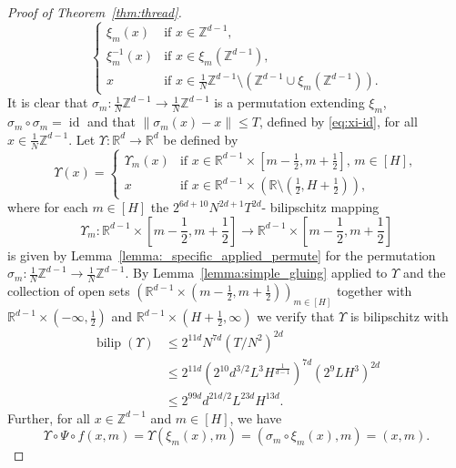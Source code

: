 \documentclass[a4paper, bibliography=totoc]{scrartcl}
\numberwithin{claimcounter}{define}
\newcommand{\R}{\mathbb{R}}
\newcommand{\Z}{\mathbb{Z}}
\newcommand{\bilip}{\operatorname{bilip}}
\DeclareMathOperator{\id}{id}
\newcommand{\enorm}[1]{\left\|#1\right\|}
\newcommand{\br}[1]{\left(#1\right)}
\newcommand{\sqbr}[1]{\left[#1\right]}
\begin{document}
\begin{proof}[Proof of Theorem~\ref{thm:thread}]
\begin{equation*}
\begin{cases}
	\xi_{m}(x) & \text{if }x\in \Z^{d-1},\\
	\xi^{-1}_{m}(x) & \text{if }x\in \xi_{m}(\Z^{d-1}),\\
	x & \text{if }x\in \frac{1}{N}\Z^{d-1}\setminus \br{\Z^{d-1}\cup \xi_{m}\br{\Z^{d-1}}}.
	\end{cases}
	\end{equation*}
	It is clear that $\sigma_{m}\colon \frac{1}{N}\Z^{d-1}\to \frac{1}{N}\Z^{d-1}$ is a permutation extending $\xi_{m}$, $\sigma_{m}\circ \sigma_{m}=\id$ and that $\enorm{\sigma_{m}(x)-x}\leq T$, defined by \eqref{eq:xi-id}, for all $x\in\frac{1}{N}\Z^{d-1}$.  
	Let $\Upsilon \colon \R^{d}\to \R^{d}$ be defined by
	\begin{equation*}
	\Upsilon(x)=\begin{cases}
	\Upsilon_{m}(x) & \text{if }x\in \R^{d-1}\times\sqbr{m-\frac{1}{2},m+\frac{1}{2}},\, m\in [H],\\
	x & \text{if }x\in\R^{d-1}\times\br{\R\setminus \br{\frac{1}{2},H+\frac{1}{2}}},
	\end{cases}
	\end{equation*}
	where for each $m\in[H]$ the  $2^{6d+10}N^{2d+1}T^{2d}$- bilipschitz mapping
	\begin{equation*}
	\Upsilon_{m}\colon \R^{d-1}\times\sqbr{m-\frac{1}{2},m+\frac{1}{2}}\to\R^{d-1}\times \sqbr{m-\frac{1}{2},m+\frac{1}{2}}
	\end{equation*}
	is given by Lemma~\ref{lemma:_specific_applied_permute} for the permutation $\sigma_{m}\colon \frac{1}{N}\Z^{d-1}\to \frac{1}{N}\Z^{d-1}$. 
	By Lemma~\ref{lemma:simple_gluing} applied to $\Upsilon$ and the collection of open sets $\br{\R^{d-1}\times\br{m-\frac{1}{2},m+\frac{1}{2}}}_{m\in [H]}$ together with $\R^{d-1}\times\br{-\infty,\frac{1}{2}}$ and $\R^{d-1}\times \br{H+\frac{1}{2},\infty}$ we verify that $\Upsilon$ is bilipschitz with
	\begin{align}
	\bilip\br{\Upsilon}&\leq 2^{11d}N^{7d}\br{T/N^{2}}^{2d}\nonumber \\
	&\leq 2^{11d}\br{2^{10}d^{3/2}L^{3}H^{\frac{1}{d-1}}}^{7d}\br{2^{9}LH^{3}}^{2d}\nonumber \\
	&\leq 2^{99d}d^{21d/2}L^{23d}H^{13d}. \label{eq:bUps}
	\end{align}
	Further, for all $x\in \Z^{d-1}$ and $m\in [H]$, we have
	\begin{equation}\label{eq:transform_to_id}
	\Upsilon\circ \Psi \circ f(x,m)=\Upsilon(\xi_{m}(x),m)=(\sigma_{m}\circ \xi_{m}(x),m)=(x,m).
	\end{equation}

\end{proof}
\end{document}
